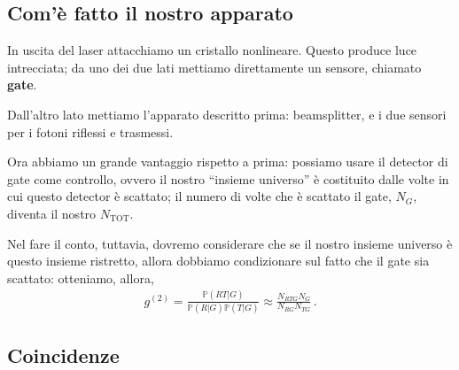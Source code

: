\documentclass{article}
\begin{document}
\subsection{Com'è fatto il nostro apparato}



In uscita del laser attacchiamo un cristallo nonlineare. 
Questo produce luce intrecciata; da uno dei due lati mettiamo direttamente un sensore, chiamato \textbf{gate}. 

Dall'altro lato mettiamo l'apparato descritto prima: beamsplitter, e i due sensori per i fotoni riflessi e trasmessi.


Ora abbiamo un grande vantaggio rispetto a prima: possiamo usare il detector di gate come controllo, ovvero il nostro ``insieme universo'' è costituito dalle volte in cui questo detector è scattato; il numero di volte che è scattato il gate, \(N_G\), diventa il nostro \(N _{\text{TOT}} \).

Nel fare il conto, tuttavia, dovremo considerare che se il nostro insieme universo è questo insieme ristretto, allora dobbiamo condizionare sul fatto che il gate sia scattato: otteniamo, allora, 
%
\begin{align}
g^{(2)} = \frac{\mathbb{P}(RT | G)}{\mathbb{P}(R|G) \mathbb{P}(T|G)}
\approx \frac{N_{RTG} N_G}{N_{RG} N_{TG}}
\,.
\end{align}

\subsection{Coincidenze}
\end{document}

